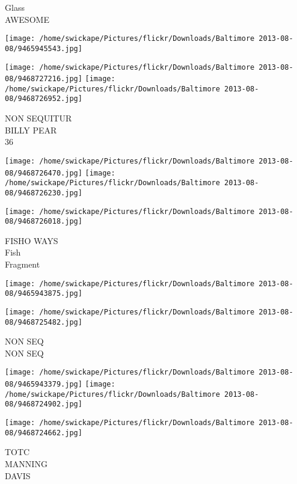 \documentclass[10pt,letterpaper]{article}
\begin{document}
Glass\\
AWESOME\\
\pagebreak

\texttt{[image: /home/swickape/Pictures/flickr/Downloads/Baltimore 2013-08-08/9465945543.jpg]}

\vspace{0.25in}
\texttt{[image: /home/swickape/Pictures/flickr/Downloads/Baltimore 2013-08-08/9468727216.jpg]}
\texttt{[image: /home/swickape/Pictures/flickr/Downloads/Baltimore 2013-08-08/9468726952.jpg]}

NON SEQUITUR\\
BILLY PEAR\\
36\\
\pagebreak

\texttt{[image: /home/swickape/Pictures/flickr/Downloads/Baltimore 2013-08-08/9468726470.jpg]}
\texttt{[image: /home/swickape/Pictures/flickr/Downloads/Baltimore 2013-08-08/9468726230.jpg]}

\vspace{0.25in}
\texttt{[image: /home/swickape/Pictures/flickr/Downloads/Baltimore 2013-08-08/9468726018.jpg]}

FISHO WAYS\\
Fish\\
Fragment\\
\pagebreak

\texttt{[image: /home/swickape/Pictures/flickr/Downloads/Baltimore 2013-08-08/9465943875.jpg]}

\vspace{0.25in}
\texttt{[image: /home/swickape/Pictures/flickr/Downloads/Baltimore 2013-08-08/9468725482.jpg]}

NON SEQ\\
NON SEQ\\
\pagebreak

\texttt{[image: /home/swickape/Pictures/flickr/Downloads/Baltimore 2013-08-08/9465943379.jpg]}
\texttt{[image: /home/swickape/Pictures/flickr/Downloads/Baltimore 2013-08-08/9468724902.jpg]}

\vspace{0.25in}
\texttt{[image: /home/swickape/Pictures/flickr/Downloads/Baltimore 2013-08-08/9468724662.jpg]}

TOTC\\
MANNING\\
DAVIS\\
\pagebreak
\end{document}
